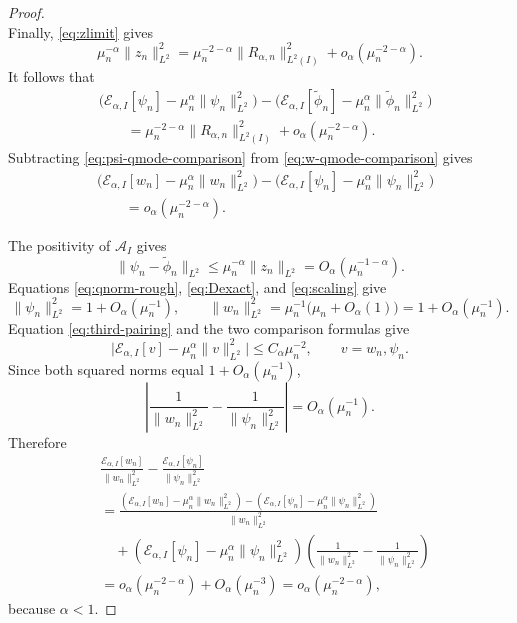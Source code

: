 \documentclass[11pt]{amsart}
\numberwithin{equation}{section}
\theoremstyle{remark}
\newcommand{\wt}{\widetilde}
\newcommand{\norm}[2][]{\lVert #2\rVert_{#1}}
\newcommand{\abs}[1]{\lvert #1\rvert}
\newcommand{\calE}{\mathcal E}
\begin{document}
\begin{proof}
\[\]
Finally, \eqref{eq:zlimit} gives
\[
 \mu_n^{-\alpha}\norm[L^2]{z_n}^2
 =\mu_n^{-2-\alpha}\norm[L^2(I)]{R_{\alpha,n}}^2
 +o_\alpha(\mu_n^{-2-\alpha}).
\]
It follows that
\begin{equation}\label{eq:psi-qmode-comparison}
 \begin{aligned}
 &\bigl(\calE_{\alpha,I}[\psi_n]
 -\mu_n^\alpha\norm[L^2]{\psi_n}^2\bigr)
 -\bigl(\calE_{\alpha,I}[\wt\phi_n]
 -\mu_n^\alpha\norm[L^2]{\wt\phi_n}^2\bigr)\\
 &\qquad=\mu_n^{-2-\alpha}\norm[L^2(I)]{R_{\alpha,n}}^2
 +o_\alpha(\mu_n^{-2-\alpha}).
 \end{aligned}
\end{equation}
Subtracting \eqref{eq:psi-qmode-comparison} from
\eqref{eq:w-qmode-comparison} gives
\[
 \begin{aligned}
 &\bigl(\calE_{\alpha,I}[w_n]
 -\mu_n^\alpha\norm[L^2]{w_n}^2\bigr)
 -\bigl(\calE_{\alpha,I}[\psi_n]
 -\mu_n^\alpha\norm[L^2]{\psi_n}^2\bigr)\\
 &\qquad=o_\alpha(\mu_n^{-2-\alpha}).
 \end{aligned}
\]

The positivity of $\mathcal A_I$ gives
\[
 \norm[L^2]{\psi_n-\wt\phi_n}
 \le\mu_n^{-\alpha}\norm[L^2]{z_n}
 =O_\alpha(\mu_n^{-1-\alpha}).
\]
Equations \eqref{eq:qnorm-rough}, \eqref{eq:Dexact}, and
\eqref{eq:scaling} give
\[
 \norm[L^2]{\psi_n}^2=1+O_\alpha(\mu_n^{-1}),
 \qquad
 \norm[L^2]{w_n}^2
 =\mu_n^{-1}\bigl(\mu_n+O_\alpha(1)\bigr)
 =1+O_\alpha(\mu_n^{-1}).
\]
Equation \eqref{eq:third-pairing} and the two comparison formulas give
\[
 \abs{\calE_{\alpha,I}[v]-\mu_n^\alpha\norm[L^2]{v}^2}
 \le C_\alpha\mu_n^{-2},
 \qquad v=w_n,\psi_n.
\]
Since both squared norms equal $1+O_\alpha(\mu_n^{-1})$,
\[
 \left|\frac1{\norm[L^2]{w_n}^2}
 -\frac1{\norm[L^2]{\psi_n}^2}\right|
 =O_\alpha(\mu_n^{-1}).
\]
Therefore
\[
 \begin{aligned}
 &\frac{\calE_{\alpha,I}[w_n]}{\norm[L^2]{w_n}^2}
 -\frac{\calE_{\alpha,I}[\psi_n]}{\norm[L^2]{\psi_n}^2}\\
 &=\frac{
 (\calE_{\alpha,I}[w_n]-\mu_n^\alpha\norm[L^2]{w_n}^2)
 -(\calE_{\alpha,I}[\psi_n]-\mu_n^\alpha\norm[L^2]{\psi_n}^2)}
 {\norm[L^2]{w_n}^2}\\
 &\quad+(\calE_{\alpha,I}[\psi_n]
 -\mu_n^\alpha\norm[L^2]{\psi_n}^2)
 \left(\frac1{\norm[L^2]{w_n}^2}
 -\frac1{\norm[L^2]{\psi_n}^2}\right)\\
 &=o_\alpha(\mu_n^{-2-\alpha})+O_\alpha(\mu_n^{-3})
 =o_\alpha(\mu_n^{-2-\alpha}),
 \end{aligned}
\]
because $\alpha<1$.


\end{proof}
\end{document}
